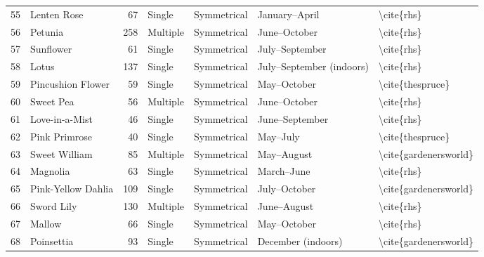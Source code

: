\begin{table}
\begin{tabular}{rlrllll}
    55 &               Lenten Rose &           67 &      Single &  Symmetrical &            January–April &              \textbackslash cite\{rhs\} \\
    56 &                   Petunia &          258 &    Multiple &  Symmetrical &             June–October &              \textbackslash cite\{rhs\} \\
    57 &                 Sunflower &           61 &      Single &  Symmetrical &           July–September &              \textbackslash cite\{rhs\} \\
    58 &                     Lotus &          137 &      Single &  Symmetrical & July–September (indoors) &              \textbackslash cite\{rhs\} \\
    59 &         Pincushion Flower &           59 &      Single &  Symmetrical &              May–October &        \textbackslash cite\{thespruce\} \\
    60 &                 Sweet Pea &           56 &    Multiple &  Symmetrical &             June–October &              \textbackslash cite\{rhs\} \\
    61 &            Love-in-a-Mist &           46 &      Single &  Symmetrical &           June–September &              \textbackslash cite\{rhs\} \\
    62 &             Pink Primrose &           40 &      Single &  Symmetrical &                 May–July &        \textbackslash cite\{thespruce\} \\
    63 &             Sweet William &           85 &    Multiple &  Symmetrical &               May–August &   \textbackslash cite\{gardenersworld\} \\
    64 &                  Magnolia &           63 &      Single &  Symmetrical &               March–June &              \textbackslash cite\{rhs\} \\
    65 &        Pink-Yellow Dahlia &          109 &      Single &  Symmetrical &             July–October &   \textbackslash cite\{gardenersworld\} \\
    66 &                Sword Lily &          130 &    Multiple &  Symmetrical &              June–August &              \textbackslash cite\{rhs\} \\
    67 &                    Mallow &           66 &      Single &  Symmetrical &              May–October &              \textbackslash cite\{rhs\} \\
    68 &                Poinsettia &           93 &      Single &  Symmetrical &       December (indoors) &   \textbackslash cite\{gardenersworld\} \\

\end{tabular}
\end{table}
